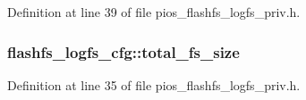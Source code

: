 Definition at line 39 of file pios\-\_\-flashfs\-\_\-logfs\-\_\-priv.\-h.

\hypertarget{group___p_i_o_s___f_l_a_s_h_f_s_ga36ee534fa25bdd1bece22e997e3ba800}{
\subsubsection[{total\-\_\-fs\-\_\-size}]{ flashfs\-\_\-logfs\-\_\-cfg\-::total\-\_\-fs\-\_\-size}}\label{group___p_i_o_s___f_l_a_s_h_f_s_ga36ee534fa25bdd1bece22e997e3ba800}


Definition at line 35 of file pios\-\_\-flashfs\-\_\-logfs\-\_\-priv.\-h.

